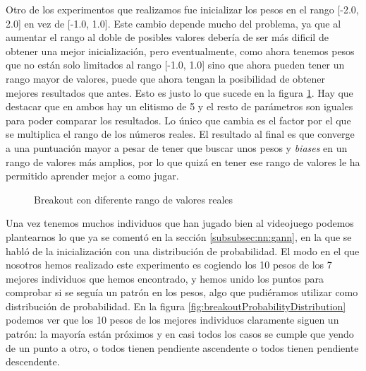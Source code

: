 Otro de los experimentos que realizamos fue inicializar los pesos en el rango [-2.0, 2.0] en vez de [-1.0, 1.0]. Este cambio depende mucho del problema, ya que al aumentar el rango al doble de posibles valores debería de ser más dificil de obtener una mejor inicialización, pero eventualmente, como ahora tenemos pesos que no están solo limitados al rango [-1.0, 1.0] sino que ahora pueden tener un rango mayor de valores, puede que ahora tengan la posibilidad de obtener mejores resultados que antes. Esto es justo lo que sucede en la figura \ref{fig:breakoutWeightsFactor2}. Hay que destacar que en ambos hay un elitismo de 5 y el resto de parámetros son iguales para poder comparar los resultados. Lo único que cambia es el factor por el que se multiplica el rango de los números reales. El resultado al final es que converge a una puntuación mayor a pesar de tener que buscar unos pesos y \textit{biases} en un rango de valores más amplios, por lo que quizá en tener ese rango de valores le ha permitido aprender mejor a como jugar.

\begin{figure}[H]
    \centering
    
    
    \caption{Breakout con diferente rango de valores reales}
    \label{fig:breakoutWeightsFactor2}
\end{figure}

Una vez tenemos muchos individuos que han jugado bien al videojuego podemos plantearnos lo que ya se comentó en la sección \ref{subsubsec:nn:gann}, en la que se habló de la inicialización con una distribución de probabilidad. El modo en el que nosotros hemos realizado este experimento es cogiendo los 10 pesos de los 7 mejores individuos que hemos encontrado, y hemos unido los puntos para comprobar si se seguía un patrón en los pesos, algo que pudiéramos utilizar como distribución de probabilidad. En la figura \ref{fig:breakoutProbabilityDistribution} podemos ver que los 10 pesos de los mejores individuos claramente siguen un patrón: la mayoría están próximos y en casi todos los casos se cumple que yendo de un punto a otro, o todos tienen pendiente ascendente o todos tienen pendiente descendente.

